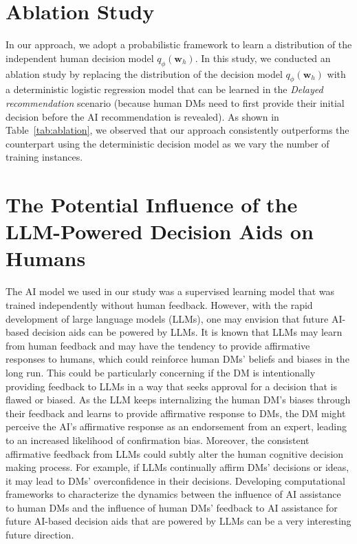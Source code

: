 \documentclass[letterpaper]{article} %
\newcommand{\my}[1]{\textcolor{blue}{[Ming: #1]}}
\begin{document}
\section{Ablation Study}
In our approach, we adopt a probabilistic framework to learn a distribution of the independent human decision model $q_{\phi}(\bm{w}_h)$. In this study, we conducted an ablation study by replacing the distribution of the decision model $q_{\phi}(\bm{w}_h)$ with a deterministic logistic regression model that can be learned in the \emph{Delayed recommendation} scenario (because human DMs need to first provide their initial decision before the AI recommendation is revealed). %
As shown in Table~\ref{tab:ablation}, we observed that our approach consistently outperforms the counterpart using the deterministic decision model as we vary the number of training instances.

\section{The Potential Influence of the LLM-Powered Decision Aids on Humans}
The AI model we used in our study was a supervised learning model that was trained independently without human feedback. However, with the rapid development of large language models (LLMs), one may envision that future AI-based decision aids can be powered by LLMs. It is known that LLMs may learn from human feedback and may have the tendency to 
provide affirmative responses to humans, which could reinforce human DMs' beliefs and biases in the long run. %
This could be particularly concerning if the DM is intentionally providing feedback to LLMs in a way that seeks approval for a decision that is flawed or biased. As the LLM keeps internalizing the human DM's biases through their feedback and learns to provide affirmative response to DMs, the DM might perceive the AI's affirmative response as an endorsement from an expert, leading to an increased likelihood of confirmation bias. Moreover, the consistent affirmative feedback from LLMs could subtly alter the human cognitive decision making process. For example, if LLMs continually affirm DMs' decisions or ideas, it may lead to DMs' overconfidence in their decisions. Developing computational frameworks to characterize the dynamics between the influence of AI assistance to human DMs and the influence of human DMs' feedback to AI assistance for future AI-based decision aids that are powered by LLMs can be a very interesting future direction. 
\end{document}
